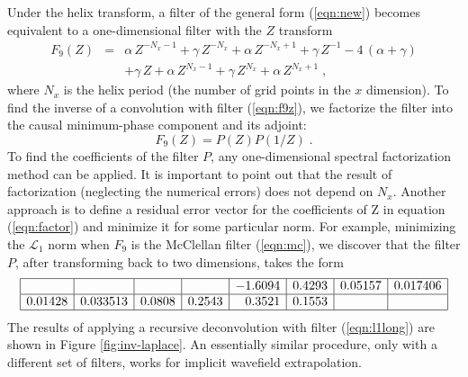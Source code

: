 Under the helix transform, a filter of the general form
(\ref{eqn:new}) becomes equivalent to a one-dimensional filter with
the $Z$ transform
\begin{eqnarray}
\label{eqn:f9z}
F_9 (Z) & = & \alpha\,Z^{-N_x-1} + \gamma\,Z^{-N_x} + \alpha\,Z^{-N_x+1} + \gamma\,Z^{-1} 
-4\,(\alpha + \gamma) \nonumber \\ & & + 
\gamma\,Z + \alpha\,Z^{N_x-1} + \gamma\,Z^{N_x} + \alpha\,Z^{N_x+1}\;,
\end{eqnarray}
where $N_x$ is the helix period (the number of grid points in the $x$
dimension). To find the inverse of a convolution with filter
(\ref{eqn:f9z}), we factorize the filter into the causal minimum-phase
component and its adjoint:
\begin{equation}
\label{eqn:factor}
F_9 (Z) = P (Z) P (1/Z)\;.
\end{equation}
To find the coefficients of the filter $P$, any one-dimensional
spectral factorization method can be applied. It is important to point
out that the result of factorization (neglecting the numerical errors)
does not depend on $N_x$. Another approach is to define a residual
error vector for the coefficients of Z in equation (\ref{eqn:factor})
and minimize it for some particular norm. For example, minimizing the
$\mathcal{L}_1$ norm when $F_9$ is the McClellan filter
(\ref{eqn:mc}), we discover that the filter $P$, after transforming
back to two dimensions, takes the form
\begin{equation}
\label{eqn:l1long}
\begin{array}{|r|r|r|r|r|r|r|r|}
\hline
     &         &           &        &     -1.6094 & 0.4293 & 0.05157 & 0.017406 \\ \hline
0.01428 & 0.033513 & 0.0808 & 0.2543 & 0.3521  & 0.1553 &   &          \\ \hline
\end{array}
\end{equation}
The results of applying a recursive deconvolution with filter
(\ref{eqn:l1long}) are shown in Figure \ref{fig:inv-laplace}.  An
essentially similar procedure, only with a different set of filters,
works for implicit wavefield extrapolation.
  

%
%


